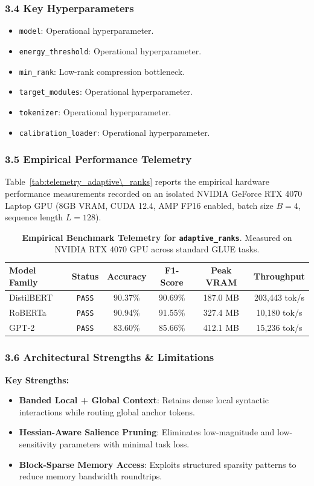\subsubsection*{3.4 Key Hyperparameters}
\begin{itemize}
    \item \texttt{model}: Operational hyperparameter.
    \item \texttt{energy\_threshold}: Operational hyperparameter.
    \item \texttt{min\_rank}: Low-rank compression bottleneck.
    \item \texttt{target\_modules}: Operational hyperparameter.
    \item \texttt{tokenizer}: Operational hyperparameter.
    \item \texttt{calibration\_loader}: Operational hyperparameter.
\end{itemize}

\subsubsection*{3.5 Empirical Performance Telemetry}
Table~\ref{tab:telemetry_adaptive\_ranks} reports the empirical hardware performance measurements recorded on an isolated NVIDIA GeForce RTX 4070 Laptop GPU (8GB VRAM, CUDA 12.4, AMP FP16 enabled, batch size $B=4$, sequence length $L=128$).

\begin{table}[h]
\centering
\small
\caption{\textbf{Empirical Benchmark Telemetry for \texttt{adaptive\_ranks}}. Measured on NVIDIA RTX 4070 GPU across standard GLUE tasks.}
\label{tab:telemetry_adaptive_ranks}
\begin{tabular*}{\columnwidth}{@{\extracolsep{\fill}}lccccc}
\toprule
\textbf{Model Family} & \textbf{Status} & \textbf{Accuracy} & \textbf{F1-Score} & \textbf{Peak VRAM} & \textbf{Throughput} \\
\midrule
DistilBERT & \texttt{PASS} & 90.37\% & 90.69\% & 187.0 MB & 203,443 tok/s \\
RoBERTa & \texttt{PASS} & 90.94\% & 91.55\% & 327.4 MB & 10,180 tok/s \\
GPT-2 & \texttt{PASS} & 83.60\% & 85.66\% & 412.1 MB & 15,236 tok/s \\
\bottomrule
\end{tabular*}
\end{table}

\subsubsection*{3.6 Architectural Strengths \& Limitations}
\textbf{Key Strengths:}
\begin{itemize}
    \item \textbf{Banded Local + Global Context}: Retains dense local syntactic interactions while routing global anchor tokens.
    \item \textbf{Hessian-Aware Salience Pruning}: Eliminates low-magnitude and low-sensitivity parameters with minimal task loss.
    \item \textbf{Block-Sparse Memory Access}: Exploits structured sparsity patterns to reduce memory bandwidth roundtrips.
\end{itemize}

